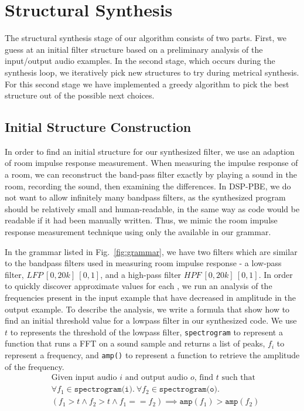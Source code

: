 \section{Structural Synthesis}
\label{sec:struct}

The structural synthesis stage of our algorithm consists of two parts.
First, we guess at an initial filter structure based on a preliminary analysis of the input/output audio examples.
In the second stage, which occurs during the synthesis loop, we iteratively pick new structures to try during metrical synthesis.
For this second stage we have implemented a greedy algorithm to pick the best structure out of the possible next choices.

\subsection{Initial Structure Construction}
\label{sec:initStruct}
In order to find an initial structure for our synthesized filter, we use an adaption of room impulse response measurement.
When measuring the impulse response of a room, we can reconstruct the band-pass filter exactly by playing a sound in the room, recording the sound, then examining the differences.
In DSP-PBE, we do not want to allow infinitely many bandpass filters, as the synthesized program should be relatively small and human-readable, in the same way as code would be readable if it had been manually written.
Thus, we mimic the room impulse response measurement technique using only the available \dspnode in our grammar.

In the grammar listed in Fig.~\ref{fig:grammar}, we have two filters which are similar to the bandpass filters used in measuring room impulse response - a low-pass filter, $LFP \ [0,20k]\ [0,1]$, and a high-pass filter $HPF\ [0,20k]\ [0,1]$.
In order to quickly discover approximate values for each \dspnode, we run an analysis of the frequencies present in the input example that have decreased in amplitude in the output example.
To describe the analysis, we write a formula that show how to find an initial threshold value for a lowpass filter in our synthesized code.
We use $t$ to represents the threshold of the lowpass filter, \texttt{spectrogram} to represent a function that runs a FFT on a sound sample and returns a list of peaks, $f_i$ to represent a frequency, and \texttt{amp()} to represent a function to retrieve the amplitude of the frequency. 
%
\begin{align*}
&\text{Given input audio }i\text{ and output audio }o\text{, find }t\text{ such that} \\
&\forall f_1 \in  \texttt{spectrogram(i)}.\ \forall f_2 \in \texttt{spectrogram(o)}. \\
&(f_1 > t \land  f_2 > t \land f_1 == f_2) \implies \texttt{amp}(f_1) > \texttt{amp}(f_2)
\end{align*}


